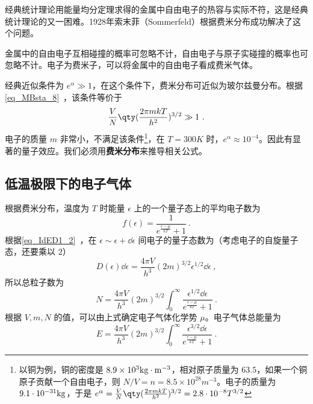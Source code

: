 

经典统计理论用能量均分定理求得的金属中自由电子的热容与实际不符，这是经典统计理论的又一困难。1928年索末菲（Sommerfeld）根据费米分布成功解决了这个问题。

金属中的自由电子互相碰撞的概率可忽略不计，自由电子与原子实碰撞的概率也可忽略不计。电子为费米子，可以将金属中的自由电子看成费米气体。

经典近似条件为 $e^{\alpha}\gg 1$，在这个条件下，费米分布可近似为玻尔兹曼分布。根据\autoref{eq_MBsta_8}~，该条件等价于
\begin{equation}
\frac{V}{N}\qty(\frac{2\pi mkT}{h^2})^{3/2}\gg 1~.
\end{equation}
电子的质量 $m$ 非常小，不满足该条件\footnote{以铜为例，铜的密度是 $8.9\times 10^3 \rm{kg\cdot m^{-3}}$，相对原子质量为 $63.5$，如果一个铜原子贡献一个自由电子，则 $N/V=n=8.5\times 10^{28} m^{-3}$。电子的质量为 $9.1\cdot 10^{-31} \rm{kg}$，于是 $e^\alpha=\frac{V}{N}\qty(\frac{2\pi m kT}{h^2})^{3/2}=2.8\cdot 10^{-8}T^{3/2}$}，在 $T=300K$ 时，$e^\alpha\approx 10^{-4}$。因此有显著的量子效应。我们必须用\textbf{费米分布}来推导相关公式。

\subsection{低温极限下的电子气体}
根据费米分布，温度为 $T$ 时能量 $\epsilon$ 上的一个量子态上的平均电子数为
\begin{equation}\label{eq_mfcgas_4}
f(\epsilon)=\frac{1}{e^{\frac{\epsilon-\mu}{kT}}+1}~.
\end{equation}
根据\autoref{eq_IdED1_2}~，在 $\epsilon\sim\epsilon+\dd \epsilon$ 间电子的量子态数为（考虑电子的自旋量子态，还要乘以 $2$）
\begin{equation}
D(\epsilon) \dd \epsilon = \frac{4\pi V}{h^3}(2m)^{3/2}\epsilon^{1/2}\dd \epsilon~,
\end{equation}
所以总粒子数为
\begin{equation}\label{eq_mfcgas_1}
N=\frac{4\pi V}{h^3}(2m)^{3/2}\int_0^\infty \frac{\epsilon^{1/2}\dd \epsilon}{e^{\frac{\epsilon-\mu}{kT}}+1}~.
\end{equation}
根据 $V,m,N$ 的值，可以由上式确定电子气体化学势 $\mu$。电子气体总能量为
\begin{equation}\label{eq_mfcgas_2}
E=\frac{4\pi V}{h^3}(2m)^{3/2}\int_0^\infty \frac{\epsilon^{3/2}\dd \epsilon}{e^{\frac{\epsilon-\mu}{kT}}+1}~.
\end{equation}

